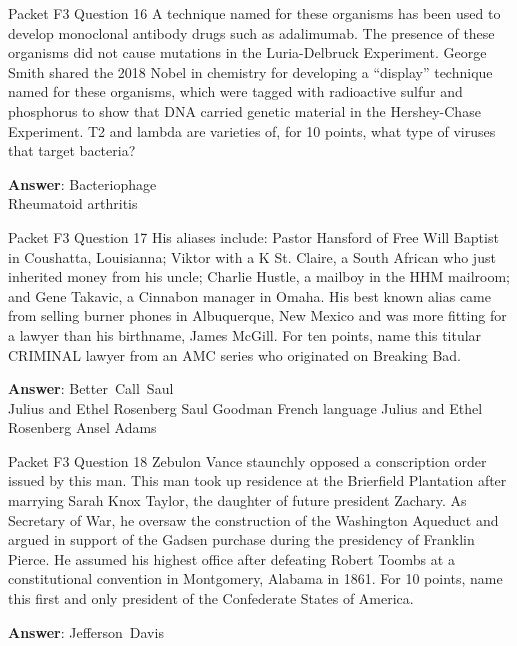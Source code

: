 \begin{frame}{Packet F3 Question 16}
A technique named for these organisms has been used to develop monoclonal antibody drugs such as adalimumab. The presence   of these organisms did not cause mutations in the Luria-Delbruck Experiment. George   Smith shared the 2018 Nobel in chemistry for developing a “display” technique named for these organisms, which were tagged with radioactive sulfur and phosphorus   to show that DNA   carried genetic material in the Hershey-Chase Experiment.   T2 and lambda are varieties of, for 10 points, what type of viruses that target bacteria?

\textbf{Answer}: Bacteriophage\\
 Rheumatoid arthritis
\end{frame}

\begin{frame}{Packet F3 Question 17}
His aliases include: Pastor   Hansford of Free Will Baptist in Coushatta, Louisianna; Viktor with a K St. Claire, a South African who just inherited money from his uncle; Charlie Hustle, a mailboy in the HHM mailroom; and Gene Takavic, a Cinnabon manager in Omaha. His best known alias came from selling burner phones in Albuquerque, New Mexico and was more fitting for a lawyer than his birthname, James McGill. For ten points, name this titular CRIMINAL lawyer from an AMC series who originated on Breaking Bad.        

\textbf{Answer}: Better\ Call\ Saul\\
 Julius and Ethel Rosenberg
 Saul Goodman
 French language
 Julius and Ethel Rosenberg
 Ansel Adams
\end{frame}

\begin{frame}{Packet F3 Question 18}
Zebulon Vance staunchly opposed a conscription order issued by this man. This man took up residence at the Brierfield Plantation after marrying Sarah Knox Taylor, the daughter of future   president Zachary. As Secretary of War, he oversaw the construction of the Washington Aqueduct and argued in support of the Gadsen purchase during the presidency of Franklin Pierce. He assumed his   highest office after defeating Robert Toombs at a constitutional   convention in Montgomery, Alabama in 1861. For 10 points,   name this first and only president of the Confederate States of America.

\textbf{Answer}: Jefferson\ Davis\\
\end{frame}

